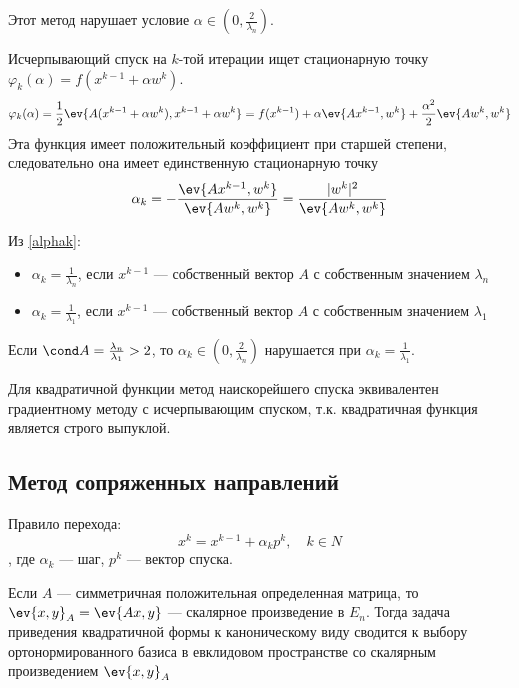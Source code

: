 Этот метод нарушает условие \(\alpha \in \left( 0, \frac{2}{\lambda_n} \right)\).

Исчерпывающий спуск на \(k\)-той итерации ищет стационарную точку \(\varphi_k(\alpha) = f(x^{k - 1} + \alpha w^k)\).
\[\varphi_k(\alpha) = \frac{1}{2} \ev{A(x^{k - 1} + \alpha w^k), x^{k - 1} + \alpha w^k} = f(x^{k - 1}) + \alpha\ev{Ax^{k - 1}, w^k} + \frac{\alpha^2}{2}\ev{A w^k, w^k}\]
Эта функция имеет положительный коэффициент при старшей степени, следовательно она имеет единственную стационарную точку
\begin{equation}
    \alpha_k = - \frac{\ev{Ax^{k - 1}, w^k}}{\ev{Aw^k, w^k}} = \frac{|w^k|^2}{\ev{Aw^k, w^k}}
    \label{alphak}
\end{equation}

Из \eqref{alphak}:
\begin{itemize}
    \item \(\alpha_k = \frac{1}{\lambda_n}\), если \(x^{k - 1}\) --- собственный вектор \(A\) с собственным значением \(\lambda_n\)
    \item \(\alpha_k = \frac{1}{\lambda_1}\), если \(x^{k - 1}\) --- собственный вектор \(A\) с собственным значением \(\lambda_1\)
\end{itemize}

Если \(\cond A = \frac{\lambda_n}{\lambda_1} > 2\), то \(\alpha_k \in \left( 0, \frac{2}{\lambda_n} \right)\) нарушается при \(\alpha_k = \frac{1}{\lambda_1}\).

Для квадратичной функции метод наискорейшего спуска эквивалентен градиентному методу с исчерпывающим спуском, т.к. квадратичная функция является строго выпуклой.

\subsection{Метод сопряженных направлений}

Правило перехода:
\begin{equation}
    x^k = x^{k - 1} + \alpha_k p^k, \quad k \in N
    \label{правило перехода}
\end{equation}
, где \(\alpha_k\) --- шаг, \(p^k\) --- вектор спуска.

Если \(A\) --- симметричная положительная определенная матрица, то \(\ev{x, y}_A = \ev{Ax, y}\) --- скалярное произведение в \(E_n\). Тогда задача приведения квадратичной формы к каноническому виду сводится к выбору ортонормированного базиса в евклидовом пространстве со скалярным произведением \(\ev{x, y}_A\)

